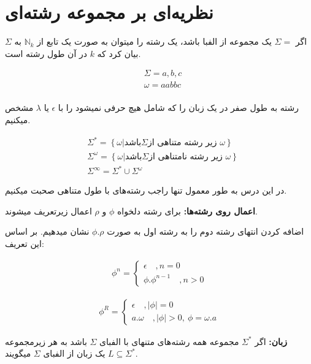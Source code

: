\chapter{نظریه‌ای بر مجموعه رشته‌ای}
اگر
$\Sigma =$
یک مجموعه از الفبا باشد،
یک رشته را میتوان به صورت یک تابع از 
$\mathbb{N}_k$
به
$\Sigma$
بیان کرد که
$k$
در آن طول رشته است.

\begin{align*}
    &\Sigma = {a, b, c}\\
    &\omega = aabbc\\
\end{align*}

رشته به طول صفر در یک زبان را که شامل هیچ حرفی نمیشود را با 
$\epsilon$
یا
$\lambda$
مشخص میکنیم.

\begin{align*}
    &\Sigma^* = \left\{ \omega |\text{باشد}\Sigma \text{زیر رشته متناهی از }\omega \right\}\\
    &\Sigma^\omega = \left\{ \omega |\text{باشد}\Sigma \text{زیر رشته نامتناهی از }\omega \right\}\\
    &\Sigma^\infty = \Sigma^* \cup \Sigma^\omega
\end{align*}

در این درس به طور معمول تنها راجب رشته‌های با طول متناهی صحبت میکنیم.

\textbf{اعمال روی رشته‌ها:}
برای رشته دلخواه 
$\phi$
و
$\rho$
اعمال زیرتعریف میشوند.

اضافه کردن انتهای رشته دوم را به رشته اول به صورت
$\phi.\rho$
نشان میدهیم.
بر اساس این تعریف:

\begin{align*}
    \phi^n = \begin{cases}
        \epsilon \quad ,n = 0\\
        \phi . \phi^{n-1} \quad, n>0
    \end{cases}
\end{align*}

\begin{align*}
    \phi^R = \begin{cases}
        \epsilon \quad, |\phi| = 0\\
        a.\omega \quad, |\phi| > 0, \ \phi = \omega.a
    \end{cases} 
\end{align*}

\textbf{زبان:}
اگر 
$\Sigma^*$
مجموعه همه رشته‌های متنهای با الفبای
$\Sigma$
باشد به هر زیرمجموعه
$L \subseteq \Sigma^*$  
یک زبان از الفبای
$\Sigma$    
میگویند.

